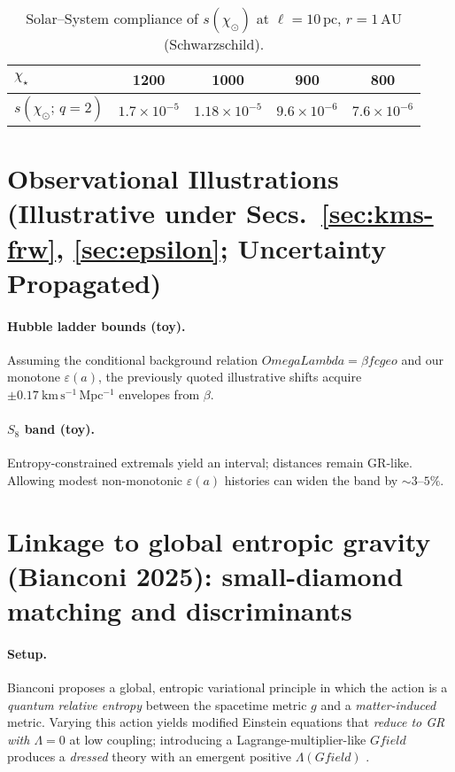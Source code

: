 \documentclass[aps,prd,onecolumn,superscriptaddress,nofootinbib]{revtex4-2}
\def\OmL{OmegaLambda}%
\def\cgeo{cgeo}%
\def\Omega_\Lambda{OmegaLambda}%
\def\Gfield{Gfield}%
\providecommand{\OmL}{\Omega_\Lambda}
\providecommand{\cgeo}{c_{\rm geo}}
\newcommand{\Gfield}{\mathcal{G}}
\begin{document}
\begin{table}[t]
\centering
\caption{Solar–System compliance of \(s(\chi_\odot)\) at \(\ell=10\,\mathrm{pc}\), \(r=1\,\mathrm{AU}\) (Schwarzschild).}
\label{tab:compliance}
\begin{tabular}{lcccc}
\toprule
$\chi_\star$ & 1200 & 1000 & 900 & 800 \\
\midrule
$s(\chi_\odot;\,q{=}2)$ & $1.7\times 10^{-5}$ & $1.18\times 10^{-5}$ & $9.6\times 10^{-6}$ & $7.6\times 10^{-6}$ \\
\bottomrule
\end{tabular}
\end{table}

\section{Observational Illustrations (Illustrative under Secs.~\ref{sec:kms-frw}, \ref{sec:epsilon}; Uncertainty Propagated)}
\label{sec:obs}
\paragraph{Hubble ladder bounds (toy).}
Assuming the conditional background relation \(\OmL=\beta f\cgeo\) and our monotone \(\varepsilon(a)\), the previously quoted illustrative shifts acquire \(\pm 0.17~\mathrm{km\,s^{-1}\,Mpc^{-1}}\) envelopes from \(\beta\).

\paragraph{\(S_8\) band (toy).}
Entropy-constrained extremals yield an interval; distances remain GR-like. Allowing modest non-monotonic \(\varepsilon(a)\) histories can widen the band by \(\sim 3\text{--}5\%\).

\section{Linkage to global entropic gravity (Bianconi 2025): small-diamond matching and discriminants}
\label{sec:bianconi-link}

\paragraph{Setup.}
Bianconi proposes a global, entropic variational principle in which the action is a \emph{quantum relative entropy} between the spacetime metric \(g\) and a \emph{matter-induced} metric. Varying this action yields modified Einstein equations that \emph{reduce to GR with \(\Lambda=0\)} at low coupling; introducing a Lagrange-multiplier-like \(\Gfield\) produces a \emph{dressed} theory with an emergent positive \(\Lambda(\Gfield)\) \cite{Bianconi2025}.
\end{document}
